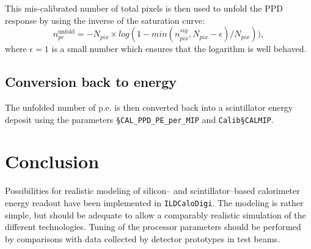 \documentclass[12pt]{article} %
\begin{document}
This mis-calibrated number of total pixels is then used to 
unfold the PPD response by using the inverse of the saturation curve:
\begin{equation*}
n_{pe}^\text{unfold} = - N_{pix} \times log ( 1 - min ( n_{pix}^{sig}, N_{pix}-\epsilon) / N_{pix} ) ),
\end{equation*}
where $\epsilon = 1$ is a small number which ensures that the logarithm is well behaved.

\subsection*{Conversion back to energy}
The unfolded number of p.e. is then converted back into a scintillator energy deposit using the parameters
{\tt \S CAL\_PPD\_PE\_per\_MIP}
and 
{\tt Calib\S CALMIP}.

\section{Conclusion}
Possibilities for realistic modeling of silicon-- and scintillator--based calorimeter  energy readout have been
implemented in {\tt ILDCaloDigi}. The modeling is rather simple, but should be adequate to allow 
a comparably realistic simulation of the different technologies. 
Tuning of the processor parameters
should be performed by comparisons with data collected by detector prototypes in test beams.
\end{document}
